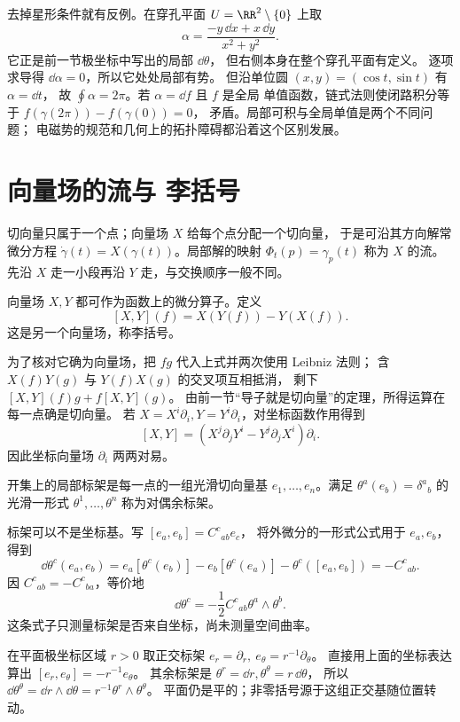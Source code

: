 去掉星形条件就有反例。在穿孔平面
\(U=\RR^2\setminus\{0\}\) 上取
\[
\alpha=\frac{-y\,\dd x+x\,\dd y}{x^2+y^2}.
\]
它正是前一节极坐标中写出的局部 \(\dd\theta\)，
但右侧本身在整个穿孔平面有定义。
逐项求导得 \(\dd\alpha=0\)，所以它处处局部有势。
但沿单位圆 \((x,y)=(\cos t,\sin t)\) 有 \(\alpha=\dd t\)，
故 \(\oint\alpha=2\pi\)。若 \(\alpha=\dd f\) 且 \(f\) 是全局
单值函数，链式法则使闭路积分等于 \(f(\gamma(2\pi))-f(\gamma(0))=0\)，
矛盾。局部可积与全局单值是两个不同问题；
电磁势的规范和几何上的拓扑障碍都沿着这个区别发展。

\section{向量场的流与 李括号}
\label{sec:math-lie-bracket-flow}

切向量只属于一个点；向量场 \(X\) 给每个点分配一个切向量，
于是可沿其方向解常微分方程
\(\dot\gamma(t)=X(\gamma(t))\)。局部解的映射
\(\Phi_t(p)=\gamma_p(t)\) 称为 \(X\) 的流。
先沿 \(X\) 走一小段再沿 \(Y\) 走，与交换顺序一般不同。

\begin{definition}[向量场的李括号]
向量场 \(X,Y\) 都可作为函数上的微分算子。定义
\[
[X,Y](f)=X(Y(f))-Y(X(f)).
\]
这是另一个向量场，称李括号。
\end{definition}

为了核对它确为向量场，把 \(fg\) 代入上式并两次使用 Leibniz 法则；
含 \(X(f)Y(g)\) 与 \(Y(f)X(g)\) 的交叉项互相抵消，
剩下 \([X,Y](f)g+f[X,Y](g)\)。
由前一节“导子就是切向量”的定理，所得运算在每一点确是切向量。
若 \(X=X^i\partial_i,Y=Y^i\partial_i\)，对坐标函数作用得到
\[
[X,Y]=(X^j\partial_jY^i-Y^j\partial_jX^i)\partial_i.
\]
因此坐标向量场 \(\partial_i\) 两两对易。

\begin{definition}[标架与余标架]
开集上的局部标架是每一点的一组光滑切向量基
\(e_1,\ldots,e_n\)。满足 \(\theta^a(e_b)=\delta^a{}_b\)
的光滑一形式 \(\theta^1,\ldots,\theta^n\) 称为对偶余标架。
\end{definition}

标架可以不是坐标基。写
\([e_a,e_b]=C^c{}_{ab}e_c\)，
将外微分的一形式公式用于 \(e_a,e_b\)，得到
\[
\dd\theta^c(e_a,e_b)
=e_a[\theta^c(e_b)]-e_b[\theta^c(e_a)]
-\theta^c([e_a,e_b])
=-C^c{}_{ab}.
\]
因 \(C^c{}_{ab}=-C^c{}_{ba}\)，等价地
\[
\dd\theta^c=-\frac12C^c{}_{ab}\theta^a\wedge\theta^b.
\]
这条式子只测量标架是否来自坐标，尚未测量空间曲率。

在平面极坐标区域 \(r>0\) 取正交标架
\(e_r=\partial_r,\ e_\theta=r^{-1}\partial_\theta\)。
直接用上面的坐标表达算出
\([e_r,e_\theta]=-r^{-1}e_\theta\)。
其余标架是 \(\theta^r=\dd r,\theta^\theta=r\,\dd\theta\)，
所以 \(\dd\theta^\theta=\dd r\wedge \dd\theta
=r^{-1}\theta^r\wedge\theta^\theta\)。
平面仍是平的；非零括号源于这组正交基随位置转动。

